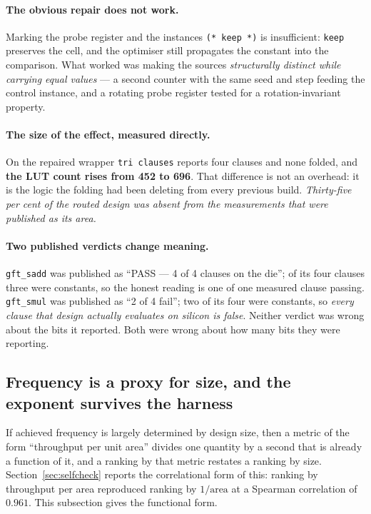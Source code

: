\paragraph{The obvious repair does not work.} Marking the probe register and the
instances \texttt{(* keep *)} is insufficient: \texttt{keep} preserves the cell,
and the optimiser still propagates the constant into the comparison. What worked
was making the sources \emph{structurally distinct while carrying equal values}
--- a second counter with the same seed and step feeding the control instance,
and a rotating probe register tested for a rotation-invariant property.

\paragraph{The size of the effect, measured directly.} On the repaired wrapper
\texttt{tri clauses} reports four clauses and none folded, and
\textbf{the LUT count rises from 452 to 696}. That difference is not an
overhead: it is the logic the folding had been deleting from every previous
build. \emph{Thirty-five per cent of the routed design was absent from the
measurements that were published as its area.}

\paragraph{Two published verdicts change meaning.} \texttt{gft\_sadd} was
published as ``PASS --- 4 of 4 clauses on the die''; of its four clauses three
were constants, so the honest reading is one of one measured clause passing.
\texttt{gft\_smul} was published as ``2 of 4 fail''; two of its four were
constants, so \emph{every clause that design actually evaluates on silicon is
false}. Neither verdict was wrong about the bits it reported. Both were wrong
about how many bits they were reporting.

\subsection{Frequency is a proxy for size, and the exponent survives the harness}
\label{sec:fmaxlaw}

If achieved frequency is largely determined by design size, then a metric of the
form ``throughput per unit area'' divides one quantity by a second that is
already a function of it, and a ranking by that metric restates a ranking by
size. Section~\ref{sec:selfcheck} reports the correlational form of this:
ranking by throughput per area reproduced ranking by $1/\text{area}$ at a
Spearman correlation of $0.961$. This subsection gives the functional form.

